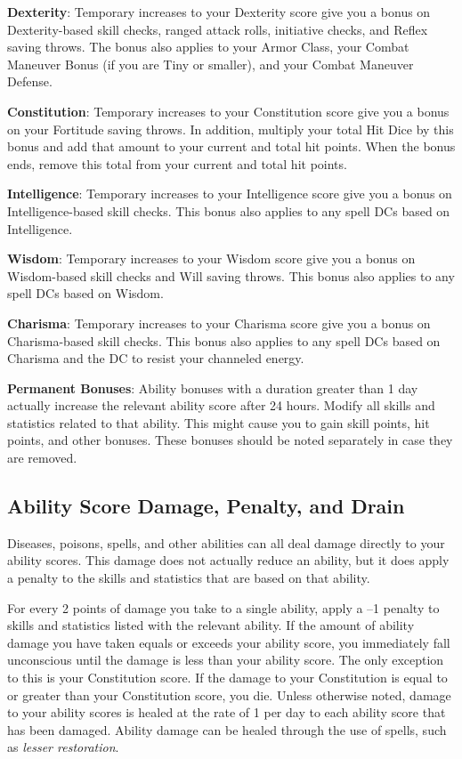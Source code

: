 \textbf{Dexterity}: Temporary increases to your Dexterity score give you a bonus on Dexterity-based skill checks, ranged attack rolls, initiative checks, and Reflex saving throws. The bonus also applies to your Armor Class, your Combat Maneuver Bonus (if you are Tiny or smaller), and your Combat Maneuver Defense.
				
\textbf{Constitution}: Temporary increases to your Constitution score give you a bonus on your Fortitude saving throws. In addition, multiply your total Hit Dice by this bonus and add that amount to your current and total hit points. When the bonus ends, remove this total from your current and total hit points.
				
\textbf{Intelligence}: Temporary increases to your Intelligence score give you a bonus on Intelligence-based skill checks. This bonus also applies to any spell DCs based on Intelligence.
				
\textbf{Wisdom}: Temporary increases to your Wisdom score give you a bonus on Wisdom-based skill checks and Will saving throws. This bonus also applies to any spell DCs based on Wisdom.
				
\textbf{Charisma}: Temporary increases to your Charisma score give you a bonus on Charisma-based skill checks. This bonus also applies to any spell DCs based on Charisma and the DC to resist your channeled energy.
				
\textbf{Permanent Bonuses}: Ability bonuses with a duration greater than 1 day actually increase the relevant ability score after 24 hours. Modify all skills and statistics related to that ability. This might cause you to gain skill points, hit points, and other bonuses. These bonuses should be noted separately in case they are removed.
												
\subsection{Ability Score Damage, Penalty, and Drain}

				
Diseases, poisons, spells, and other abilities can all deal damage directly to your ability scores. This damage does not actually reduce an ability, but it does apply a penalty to the skills and statistics that are based on that ability.
				
For every 2 points of damage you take to a single ability, apply a --1 penalty to skills and statistics listed with the relevant ability. If the amount of ability damage you have taken equals or exceeds your ability score, you immediately fall unconscious until the damage is less than your ability score. The only exception to this is your Constitution score. If the damage to your Constitution is equal to or greater than your Constitution score, you die. Unless otherwise noted, damage to your ability scores is healed at the rate of 1 per day to each ability score that has been damaged. Ability damage can be healed through the use of spells, such as \textit{lesser restoration}. 
				
